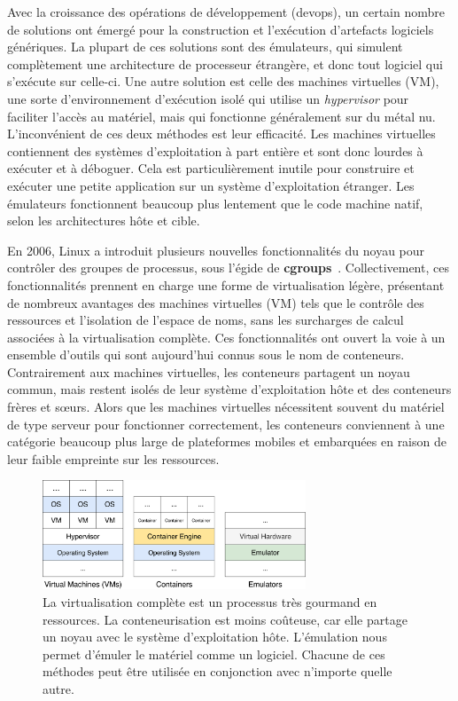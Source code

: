 Avec la croissance des opérations de développement (devops), un certain nombre de solutions ont émergé pour la construction et l'exécution d'artefacts logiciels génériques. La plupart de ces solutions sont des émulateurs, qui simulent complètement une architecture de processeur étrangère, et donc tout logiciel qui s'exécute sur celle-ci. Une autre solution est celle des machines virtuelles (VM), une sorte d'environnement d'exécution isolé qui utilise un \textit{hypervisor} pour faciliter l'accès au matériel, mais qui fonctionne généralement sur du métal nu. L'inconvénient de ces deux méthodes est leur efficacité. Les machines virtuelles contiennent des systèmes d'exploitation à part entière et sont donc lourdes à exécuter et à déboguer. Cela est particulièrement inutile pour construire et exécuter une petite application sur un système d'exploitation étranger. Les émulateurs fonctionnent beaucoup plus lentement que le code machine natif, selon les architectures hôte et cible.

En 2006, Linux a introduit plusieurs nouvelles fonctionnalités du noyau pour contrôler des groupes de processus, sous l'égide de \textbf{cgroups}~\citep{menage2007adding}. Collectivement, ces fonctionnalités prennent en charge une forme de virtualisation légère, présentant de nombreux avantages des machines virtuelles (VM) tels que le contrôle des ressources et l'isolation de l'espace de noms, sans les surcharges de calcul associées à la virtualisation complète. Ces fonctionnalités ont ouvert la voie à un ensemble d'outils qui sont aujourd'hui connus sous le nom de conteneurs. Contrairement aux machines virtuelles, les conteneurs partagent un noyau commun, mais restent isolés de leur système d'exploitation hôte et des conteneurs frères et sœurs. Alors que les machines virtuelles nécessitent souvent du matériel de type serveur pour fonctionner correctement, les conteneurs conviennent à une catégorie beaucoup plus large de plateformes mobiles et embarquées en raison de leur faible empreinte sur les ressources.

\begin{figure}
\centrer
\includegraphics[width=0.70\textwidth]{../figures/vms_containers_emulators.png}
\caption{La virtualisation complète est un processus très gourmand en ressources. La conteneurisation est moins coûteuse, car elle partage un noyau avec le système d'exploitation hôte. L'émulation nous permet d'émuler le matériel comme un logiciel. Chacune de ces méthodes peut être utilisée en conjonction avec n'importe quelle autre.\vspace{-10pt}}
\label{fig:vms_containers_emulators}
\end{figure}

